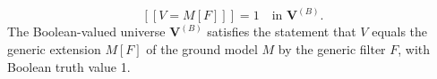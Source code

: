 $$[[V = M[F]]] = 1 \quad \text{in } \mathbf{V}^{(B)}.$$
The Boolean-valued universe $\mathbf{V}^{(B)}$ satisfies the statement that $V$ equals the generic extension $M[F]$ of the ground model $M$ by the generic filter $F$, with Boolean truth value 1.
